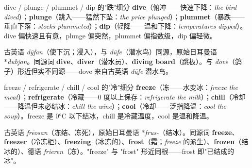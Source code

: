 \documentclass[../main.tex]{subfiles}
\begin{document}



\begin{gram}{dive / plunge / plummet / dip 的"跌"细分}
\textbf{dive}（俯冲——快速下降：\textit{the bird dived}）；\textbf{plunge}（跳入——猛然下坠：\textit{the price plunged}）；\textbf{plummet}（暴跌——垂直下落：\textit{stocks plummeted}）；\textbf{dip}（轻降——温和下降：\textit{temperatures dipped}）。dive 偏快速且有意，plunge 偏突然，plummet 偏指数级，dip 偏轻微。
\end{gram}

\begin{origin}
古英语 \textit{dȳfan}（使下沉；浸入），与 \textit{dūfe}（潜水鸟）同源，原始日耳曼语 *\textit{dūbjan}。同源词 \textbf{dive}、\textbf{diver}（潜水员）、\textbf{diving board}（跳板）。与 \textit{dove}（鸽子）形近但实不同源——dove 来自古英语 \textit{dūfe} 潜水鸟。
\end{origin}





\begin{gram}{freeze / refrigerate / chill / cool 的"冷"细分}
\textbf{freeze}（冻——水变冰：\textit{freeze the meat}）；\textbf{refrigerate}（冷藏——0 度以上保存：\textit{refrigerate the milk}）；\textbf{chill}（冷却——降温但未必结冰：\textit{chill the wine}）；\textbf{cool}（冷却——泛指降温：\textit{cool the soup}）。freeze 是 0°C 以下结冰，chill 是冷藏温度，cool 是温和降温。
\end{gram}

\begin{origin}
古英语 \textit{frēosan}（冻结、冻死），原始日耳曼语 *\textit{frus-}（结冰）。同源词 \textbf{freeze}、\textbf{freezer}（冷冻柜）、\textbf{freezing}（冰冻的）、\textbf{frost}（霜；\textit{freeze} 的派生）、\textbf{frozen}（结冰的）、德语 \textit{frieren}（冻）。"freeze" 与 "frost" 形近同根——frost 即"已结成的冰"。
\end{origin}
\end{document}
